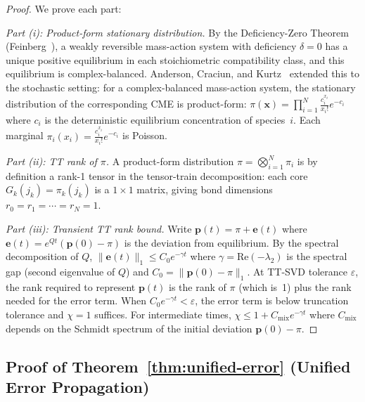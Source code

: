 \documentclass[11pt]{article}
\newcommand{\norm}[1]{\lVert #1 \rVert}
\begin{document}
\begin{proof}
We prove each part:

\emph{Part (i): Product-form stationary distribution.}
By the Deficiency-Zero Theorem (Feinberg~\cite{feinberg1972}),
a weakly reversible mass-action system with deficiency $\delta = 0$
has a unique positive equilibrium in each stoichiometric compatibility
class, and this equilibrium is complex-balanced.
Anderson, Craciun, and Kurtz~\cite{anderson2010} extended this to the
stochastic setting: for a complex-balanced mass-action system, the
stationary distribution of the corresponding CME is product-form:
$\pi(\mathbf{x}) = \prod_{i=1}^N \frac{c_i^{x_i}}{x_i!} e^{-c_i}$
where $c_i$ is the deterministic equilibrium concentration of species~$i$.
Each marginal $\pi_i(x_i) = \frac{c_i^{x_i}}{x_i!} e^{-c_i}$ is Poisson.

\emph{Part (ii): TT rank of $\pi$.}
A product-form distribution $\pi = \bigotimes_{i=1}^N \pi_i$ is by
definition a rank-1 tensor in the tensor-train decomposition:
each core $G_k(j_k) = \pi_k(j_k)$ is a $1 \times 1$ matrix, giving
bond dimensions $r_0 = r_1 = \cdots = r_N = 1$.

\emph{Part (iii): Transient TT rank bound.}
Write $\mathbf{p}(t) = \pi + \mathbf{e}(t)$ where $\mathbf{e}(t) = e^{Qt}(\mathbf{p}(0) - \pi)$
is the deviation from equilibrium.
By the spectral decomposition of $Q$, $\norm{\mathbf{e}(t)}_1 \leq C_0 e^{-\gamma t}$
where $\gamma = \mathrm{Re}(-\lambda_2)$ is the spectral gap
(second eigenvalue of $Q$) and $C_0 = \norm{\mathbf{p}(0) - \pi}_1$.
At TT-SVD tolerance $\varepsilon$, the rank required to represent
$\mathbf{p}(t)$ is the rank of $\pi$ (which is~1) plus the rank
needed for the error term.
When $C_0 e^{-\gamma t} < \varepsilon$, the error term is below
truncation tolerance and $\chi = 1$ suffices.
For intermediate times, $\chi \leq 1 + C_{\mathrm{mix}} e^{-\gamma t}$
where $C_{\mathrm{mix}}$ depends on the Schmidt spectrum of the
initial deviation $\mathbf{p}(0) - \pi$.
\end{proof}

\subsection{Proof of Theorem~\ref{thm:unified-error} (Unified Error Propagation)}
\end{document}

